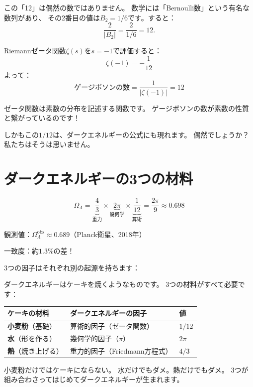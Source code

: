 \documentclass[12pt,a4paper]{article}
\begin{document}
この「12」は偶然の数ではありません。
数学には「Bernoulli数」という有名な数列があり、
その2番目の値は$B_2 = 1/6$です。すると：
\[
  \frac{2}{|B_2|} = \frac{2}{1/6} = 12.
\]

\begin{mathbox}[Riemannゼータ関数との繋がり]
Riemannゼータ関数$\zeta(s)$を$s = -1$で評価すると：
\[
  \zeta(-1) = -\frac{1}{12}
\]
よって：
\[
  \text{ゲージボソンの数} = \frac{1}{|\zeta(-1)|} = 12
\]

ゼータ関数は素数の分布を記述する関数です。
ゲージボソンの数が素数の性質と繋がっているのです！

しかもこの$1/12$は、ダークエネルギーの公式にも現れます。
偶然でしょうか？ 私たちはそうは思いません。
\end{mathbox}

\section{ダークエネルギーの3つの材料}

\begin{keyidea}[ダークエネルギーの公式]
\[
  \Omega_\Lambda = \underbrace{\frac{4}{3}}_{\text{重力}} \times
                   \underbrace{2\pi}_{\text{幾何学}} \times
                   \underbrace{\frac{1}{12}}_{\text{算術}} =
                   \frac{2\pi}{9} \approx 0.698
\]

観測値：$\Omega_\Lambda^{\text{obs}} \approx 0.689$（Planck衛星、2018年）

一致度：約$1.3\%$の差！
\end{keyidea}

3つの因子はそれぞれ別の起源を持ちます：

\begin{analogy}[ケーキのアナロジー]
ダークエネルギーはケーキを焼くようなものです。
3つの材料がすべて必要です：

\begin{center}
\begin{tabular}{lll}
\toprule
ケーキの材料 & ダークエネルギーの因子 & 値 \\
\midrule
\textbf{小麦粉}（基礎） & 算術的因子（ゼータ関数） & $1/12$ \\
\textbf{水}（形を作る） & 幾何学的因子（$\pi$） & $2\pi$ \\
\textbf{熱}（焼き上げる） & 重力的因子（Friedmann方程式） & $4/3$ \\
\bottomrule
\end{tabular}
\end{center}

小麦粉だけではケーキにならない。
水だけでもダメ。熱だけでもダメ。
3つが組み合わさってはじめてダークエネルギーが生まれます。
\end{analogy}
\end{document}

